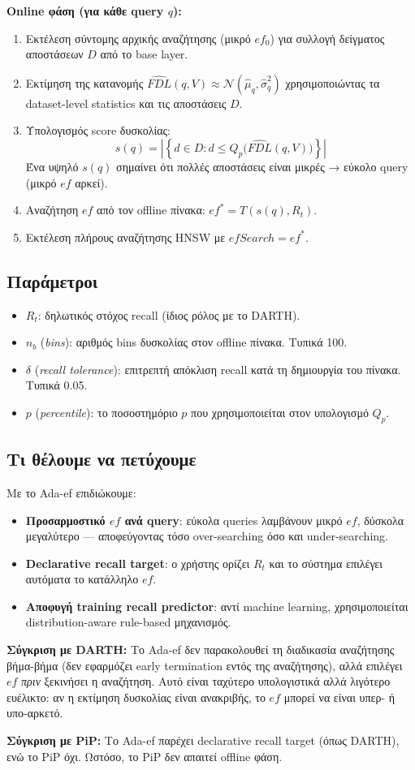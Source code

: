 \documentclass[12pt,a4paper]{article}
\begin{document}
\textbf{Online φάση (για κάθε query $q$):}
\begin{enumerate}
  \item Εκτέλεση σύντομης αρχικής αναζήτησης (μικρό $ef_0$) για συλλογή δείγματος αποστάσεων $D$ από το base layer.
  \item Εκτίμηση της κατανομής $\widehat{FDL}(q,V) \approx \mathcal{N}(\hat{\mu}_q, \hat{\sigma}_q^2)$ χρησιμοποιώντας τα dataset-level statistics και τις αποστάσεις $D$.
  \item Υπολογισμός score δυσκολίας:
  \[
  s(q) = \left|\left\{d \in D : d \le Q_p\bigl(\widehat{FDL}(q,V)\bigr)\right\}\right|
  \]
  Ένα υψηλό $s(q)$ σημαίνει ότι πολλές αποστάσεις είναι μικρές → εύκολο query (μικρό $ef$ αρκεί).
  \item Αναζήτηση $ef$ από τον offline πίνακα: $ef^* = T(s(q), R_t)$.
  \item Εκτέλεση πλήρους αναζήτησης HNSW με $efSearch = ef^*$.
\end{enumerate}

\subsection{Παράμετροι}
\begin{itemize}
  \item $R_t$: δηλωτικός στόχος recall (ίδιος ρόλος με το DARTH).
  \item $n_b$ (\emph{bins}): αριθμός bins δυσκολίας στον offline πίνακα. Τυπικά 100.
  \item $\delta$ (\emph{recall tolerance}): επιτρεπτή απόκλιση recall κατά τη δημιουργία του πίνακα. Τυπικά 0.05.
  \item $p$ (\emph{percentile}): το ποσοστημόριο $p$ που χρησιμοποιείται στον υπολογισμό $Q_p$.
\end{itemize}

\subsection{Τι θέλουμε να πετύχουμε}
Με το Ada-ef επιδιώκουμε:

\begin{itemize}
    \item \textbf{Προσαρμοστικό $ef$ ανά query}: εύκολα queries λαμβάνουν μικρό $ef$, δύσκολα μεγαλύτερο — αποφεύγοντας τόσο over-searching όσο και under-searching.
    \item \textbf{Declarative recall target}: ο χρήστης ορίζει $R_t$ και το σύστημα επιλέγει αυτόματα το κατάλληλο $ef$.
    \item \textbf{Αποφυγή training recall predictor}: αντί machine learning, χρησιμοποιείται distribution-aware rule-based μηχανισμός.
\end{itemize}

\textbf{Σύγκριση με DARTH:} Το Ada-ef δεν παρακολουθεί τη διαδικασία αναζήτησης βήμα-βήμα (δεν εφαρμόζει early termination εντός της αναζήτησης), αλλά επιλέγει $ef$ \emph{πριν} ξεκινήσει η αναζήτηση. Αυτό είναι ταχύτερο υπολογιστικά αλλά λιγότερο ευέλικτο: αν η εκτίμηση δυσκολίας είναι ανακριβής, το $ef$ μπορεί να είναι υπερ- ή υπο-αρκετό.

\textbf{Σύγκριση με PiP:} Το Ada-ef παρέχει declarative recall target (όπως DARTH), ενώ το PiP όχι. Ωστόσο, το PiP δεν απαιτεί offline φάση.
\end{document}
